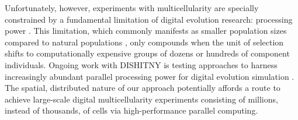 Unfortunately, however, experiments with multicellularity are specially constrained by a fundamental limitation of digital evolution research: processing power \citep{Moreno_2020}.
This limitation, which commonly manifests as smaller population sizes compared to natural populations \citep{liard2018complexity}, only compounds when the unit of selection shifts to computationally expensive groups of dozens or hundreds of component individuals.
Ongoing work with DISHITNY is testing approaches to harness increasingly abundant parallel processing power for digital evolution simulation \citep{moreno2021conduit}.
The spatial, distributed nature of our approach potentially affords a route to achieve large-scale digital multicellularity experiments consisting of millions, instead of thousands, of cells via high-performance parallel computing.
